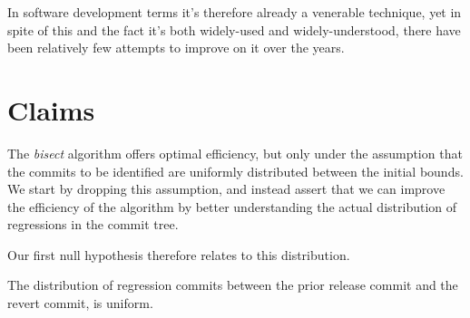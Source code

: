 \documentclass[10pt,journal,compsoc]{IEEEtran}
\begin{document}
In software development terms it's therefore already a venerable technique, yet in spite of this and the fact it's both widely-used and widely-understood, there have been relatively few attempts to improve on it over the years.




\section{Claims}

The {\it bisect\/} algorithm offers optimal efficiency, but only under the assumption that the commits to be identified are uniformly distributed between the initial bounds. We start by dropping this assumption, and instead assert that we can improve the efficiency of the algorithm by better understanding the actual distribution of regressions in the commit tree.

Our first null hypothesis therefore relates to this distribution.

\begin{hypothesis}
\label{hyp-uniform}
The distribution of regression commits between the prior release commit and the revert commit, is uniform.
\end{hypothesis}
\end{document}
